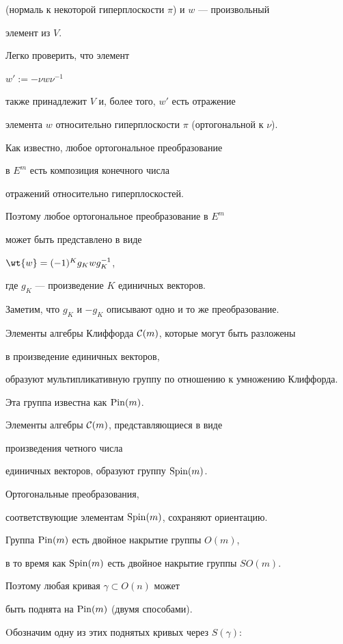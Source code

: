 (нормаль к некоторой гиперплоскости $\pi$) и $w$ --- произвольный


элемент из $V$.


Легко проверить, что элемент


$w' := - \nu w \nu^{-1}$


также принадлежит $V$ и, более того, $w'$ есть отражение


элемента $w$ относительно гиперплоскости $\pi$ (ортогональной к $\nu$).





Как известно, любое ортогональное преобразование


в $E^m$ есть композиция конечного числа


отражений относительно гиперплоскостей.


Поэтому любое ортогональное преобразование в $E^m$


может быть представлено в виде


$\wt{w} = (-1)^K g_K w g_K^{-1}$,


где $g_K$ --- произведение $K$ единичных векторов.


Заметим, что $g_K$ и $-g_K$ описывают одно и то же преобразование.





Элементы алгебры Клиффорда ${\cal C}(m)$, которые могут быть разложены


в произведение единичных векторов, 


образуют мультипликативную группу по отношению к умножению Клиффорда.


Эта группа известна как $\operatorname{Pin}(m)$.


Элементы алгебры ${\cal C}(m)$, представляющиеся в виде


произведения четного числа


единичных векторов, образуют группу $\operatorname{Spin}(m)$.


Ортогональные преобразования,


соответствующие элементам $\operatorname{Spin}(m)$, сохраняют ориентацию.


Группа $\operatorname{Pin}(m)$ есть двойное накрытие группы $O(m)$,


в то время как $\operatorname{Spin}(m)$ есть двойное накрытие группы $SO(m)$.


Поэтому любая кривая $\gamma \subset O(n)$ может


быть поднята на $\operatorname{Pin}(m)$ (двумя способами).


Oбозначим одну из этих поднятых кривых через $S(\gamma)$:


